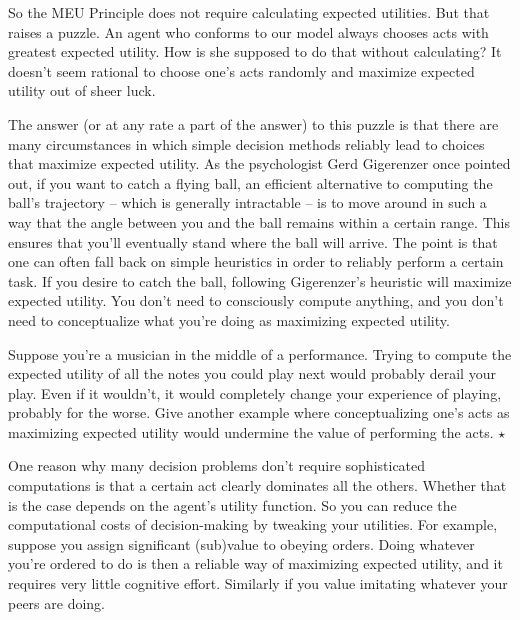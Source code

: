 
So the MEU Principle does not require calculating expected
utilities. But that raises a puzzle. An agent who conforms to our
model always chooses acts with greatest expected utility. How is she
supposed to do that without calculating? It doesn't seem rational to
choose one's acts randomly and maximize expected utility out of sheer
luck.

The answer (or at any rate a part of the answer) to this puzzle is
that there are many circumstances in which simple decision methods
reliably lead to choices that maximize expected utility. As the
psychologist Gerd Gigerenzer once pointed out, if you want to catch a
flying ball, an efficient alternative to computing the ball's
trajectory -- which is generally intractable -- is to move around in
such a way that the angle between you and the ball remains within a
certain range. This ensures that you'll eventually stand where the
ball will arrive. The point is that one can often fall back on simple
heuristics in order to reliably perform a certain task. If you desire
to catch the ball, following Gigerenzer's heuristic will maximize
expected utility. You don't need to consciously compute anything, and
you don't need to conceptualize what you're doing as maximizing
expected utility.

\begin{exercise}
  Suppose you're a musician in the middle of a performance. Trying to
  compute the expected utility of all the notes you could play next
  would probably derail your play. Even if it wouldn't, it would
  completely change your experience of playing, probably for the
  worse. Give another example where conceptualizing one's acts as
  maximizing expected utility would undermine the value of performing
  the acts. $\star$
\end{exercise}

One reason why many decision problems don't require sophisticated
computations is that a certain act clearly dominates all the
others. Whether that is the case depends on the agent's utility
function. So you can reduce the computational costs of decision-making
by tweaking your utilities. For example, suppose you assign
significant (sub)value to obeying orders. Doing whatever you're
ordered to do is then a reliable way of maximizing expected utility,
and it requires very little cognitive effort. Similarly if you value
imitating whatever your peers are doing.

